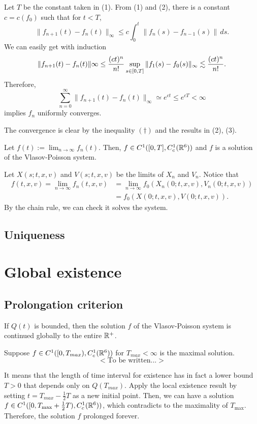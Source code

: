 \documentclass[11pt]{amsart}
\begin{document}
\begin{pfs}
\item
Let $T$ be the constant taken in (1).
From (1) and (2), there is a constant $c=c(f_0)$ such that for $t<T$,
\[\|f_{n+1}(t)-f_n(t)\|_\infty\le c\int_0^t\|f_n(s)-f_{n-1}(s)\|\,ds.\]
We can easily get with induction
\[\|f_{n+1}(t)-f_n(t)\|\infty\le\frac{(ct)^n}{n!}\sup_{s\in[0,T]}\|f_1(s)-f_0(s)\|_\infty\lesssim\frac{(ct)^n}{n!}.\]
Therefore,
\[\sum_{n=0}^\infty\|f_{n+1}(t)-f_n(t)\|_\infty\simeq e^{ct}\le e^{cT}<\infty\]
implies $f_n$ uniformly converges.

\item
The convergence is clear by the inequality $(\dagger)$ and the results in (2), (3).\qedhere
\end{pfs}

\begin{prop}
Let $f(t):=\lim_{n\to\infty}f_n(t)$.
Then, $f\in C^1([0,T],C_c^1(\mathbb{R}^6))$ and $f$ is a solution of the Vlasov-Poisson system.
\end{prop}
\begin{pf}
Let $X(s;t,x,v)$ and $V(s;t,x,v)$ be the limits of $X_n$ and $V_n$.
Notice that
\begin{align*}
f(t,x,v)=\lim_{n\to\infty}f_n(t,x,v)&=\lim_{n\to\infty}f_0(X_n(0;t,x,v),V_n(0;t,x,v))\\
&=f_0(X(0;t,x,v),V(0;t,x,v)).
\end{align*}
By the chain rule, we can check it solves the system.
\end{pf}


\subsection{Uniqueness}










\section{Global existence}


\subsection{Prolongation criterion}

\begin{prop}
If $Q(t)$ is bounded, then the solution $f$ of the Vlasov-Poisson system is continued globally to the entire $\mathbb{R}^+$.
\end{prop}
\begin{pf}
Suppose $f\in C^1([0,T_{max}),C_c^1(\mathbb{R}^6))$ for $T_{max}<\infty$ is the maximal solution.
\[<\text{To be written...}>\]

It means that the length of time interval for existence has in fact a lower bound $T>0$ that depends only on $Q(T_{max})$.
Apply the local existence result by setting $t=T_{max}-\frac12T$ as a new initial point.
Then, we can have a solution $f\in C^1([0,T_{\max}+\frac12T),C_c^1(\mathbb{R}^6))$, which contradicts to the maximality of $T_{\max}$.
Therefore, the solution $f$ prolonged forever.
\end{pf}
\end{document}

